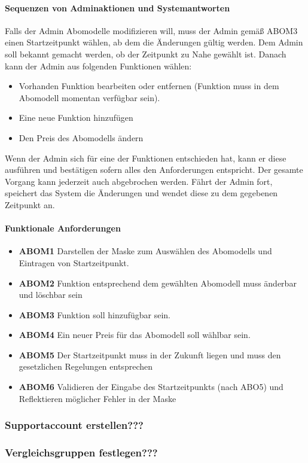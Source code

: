 \paragraph{Sequenzen von Adminaktionen und Systemantworten}
Falls der Admin Abomodelle modifizieren will, muss der Admin gemäß ABOM3 einen Startzeitpunkt wählen, ab dem die Änderungen gültig werden. Dem Admin soll bekannt gemacht werden, ob der Zeitpunkt zu Nahe gewählt ist. Danach kann der Admin aus folgenden Funktionen wählen:
\begin{itemize}
	\item Vorhanden Funktion bearbeiten oder entfernen (Funktion muss in dem Abomodell momentan verfügbar sein).
	\item Eine neue Funktion hinzufügen
	\item Den Preis des Abomodells ändern
\end{itemize}
Wenn der Admin sich für eine der Funktionen entschieden hat, kann er diese ausführen und bestätigen sofern alles den Anforderungen entspricht. Der gesamte Vorgang kann jederzeit auch abgebrochen werden. Fährt der Admin fort, speichert das System die Änderungen und wendet diese zu dem gegebenen Zeitpunkt an.

\paragraph{Funktionale Anforderungen}
\begin{itemize}
	\item \textbf{ABOM1} Darstellen der Maske zum Auswählen des Abomodells und Eintragen von Startzeitpunkt.
	\item \textbf{ABOM2} Funktion entsprechend dem gewählten Abomodell muss änderbar und löschbar sein
	\item \textbf{ABOM3} Funktion soll hinzufügbar sein.
	\item \textbf{ABOM4} Ein neuer Preis für das Abomodell soll wählbar sein.
	\item \textbf{ABOM5} Der Startzeitpunkt muss in der Zukunft liegen und muss den gesetzlichen Regelungen entsprechen
	\item \textbf{ABOM6} Validieren der Eingabe des Startzeitpunkts (nach ABO5) und Reflektieren möglicher Fehler in der Maske
\end{itemize}


\subsubsection{Supportaccount erstellen???}

\subsubsection{Vergleichsgruppen festlegen???}
